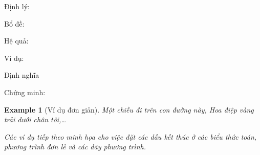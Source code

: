 \medskip 
Định lý:
\begin{command}
  \theoremstyle{marginbreak}
  \theoremheaderfont{\normalfont\bfseries}\theorembodyfont{\slshape}
  \theoremsymbol{\ensuremath{\diamondsuit}}
  \theoremseparator{:}
  \newtheorem{Theorem}{Theorem}\end{command}
Bổ đề:
\begin{command}
  \theoremstyle{changebreak}
  \theoremsymbol{\ensuremath{\heartsuit}}
  \newtheorem{Lemma}{Lemma}\end{command}
 Hệ quả:
\begin{command}
  \theoremsymbol{\ensuremath{\spadesuit}}
  \newtheorem{Corollary}[Theorem]{Corollary}
\end{command}
Ví dụ:
\begin{command}
  \theoremstyle{change}
  \theorembodyfont{\upshape}
  \theoremsymbol{\ensuremath{\ast}}
  \theoremseparator{}
  \newtheorem{Example}{Example}\end{command}
 Định nghĩa
\begin{command}
  \theoremstyle{plain}
  \theoremsymbol{\ensuremath{\clubsuit}}
  \newtheorem{Definition}{Definition}\end{command}
Chứng minh:
\begin{command}
  \theoremheaderfont{\sc}\theorembodyfont{\upshape}
  \theoremstyle{nonumberplain}
  \theoremseparator{}
  \theoremsymbol{\rule{1ex}{1ex}}
  \newtheorem{Proof}{Proof}
\end{command}

{\color{-red!75!green!50}
\begin{Example}[Ví dụ đơn giản]
Một chiều đi trên con đường này, Hoa điệp vàng trải dưới chân tôi,\ldots 

	Các ví dụ tiếp theo minh họa cho việc đặt các dấu kết thúc
	ở các biểu thức toán, phương trình đơn lẻ và các dãy phương trình.
\end{Example}
}

